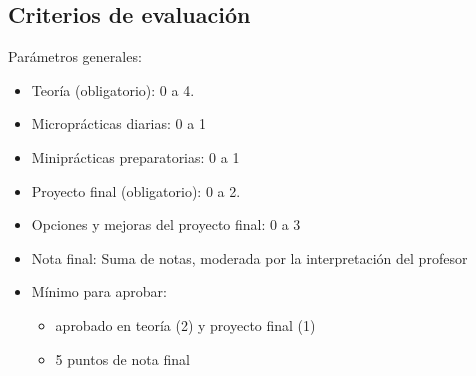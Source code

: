 \documentclass[a4paper,12pt]{article}
\begin{document}


\subsection{Criterios de evaluación}

Parámetros generales:

\begin{itemize}
\item Teoría (obligatorio): 0 a 4.
\item Microprácticas diarias: 0 a 1
\item Miniprácticas preparatorias: 0 a 1
\item Proyecto final (obligatorio): 0 a 2.
\item Opciones y mejoras del proyecto final: 0 a 3
\item Nota final: Suma de notas, moderada por la interpretación del profesor
\item Mínimo para aprobar:
      \begin{itemize}
      \item aprobado en teoría (2) y proyecto final (1)
      \item 5 puntos de nota final
      \end{itemize}
\end{itemize}
\end{document}
